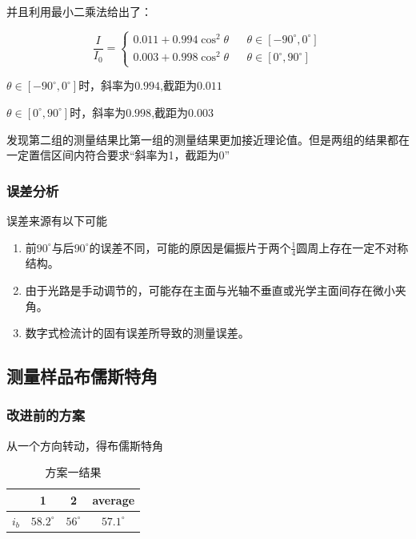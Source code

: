 \documentclass[a4paper,UTF8]{ctexart}
\begin{document}
并且利用最小二乘法给出了：

\begin{equation}
    \frac{I}{I_0} = \left\{
        \begin{array}{clr}
            0.011 + 0.994 \cos^2{\theta} & & \theta \in \left[-90^\circ,0^\circ\right] \\
            0.003 + 0.998 \cos^2{\theta} & & \theta \in \left[0^\circ,90^\circ\right] 
        \end{array}\right.
\end{equation}

$\theta \in \left[-90^\circ,0^\circ\right]$时，斜率为$0.994$,截距为$0.011$

$\theta \in \left[0^\circ,90^\circ\right]$时，斜率为$0.998$,截距为$0.003$

发现第二组的测量结果比第一组的测量结果更加接近理论值。但是两组的结果都在一定置信区间内符合要求“斜率为1，截距为0”

\subsubsection{误差分析}

误差来源有以下可能

\begin{enumerate}
    \item 前$90^\circ$与后$90^\circ$的误差不同，可能的原因是偏振片于两个$\frac{1}{4}$圆周上存在一定不对称结构。
    \item 由于光路是手动调节的，可能存在主面与光轴不垂直或光学主面间存在微小夹角。
    \item 数字式检流计的固有误差所导致的测量误差。
\end{enumerate}

\subsection{测量样品布儒斯特角}


\subsubsection{改进前的方案}

从一个方向转动，得布儒斯特角

\begin{table}[htb]
    \begin{center}
        \begin{tabular}{|c|c|c|c|}
            \hline
            & \bfseries 1 & \bfseries 2 & \bfseries average \\
            \hline
            \bfseries $i_b$ & $58.2^\circ$ & $56^\circ$ & $57.1^\circ$ \\
            \hline
        \end{tabular}
    \end{center}
    \caption{方案一结果}
\end{table}
\end{document}
